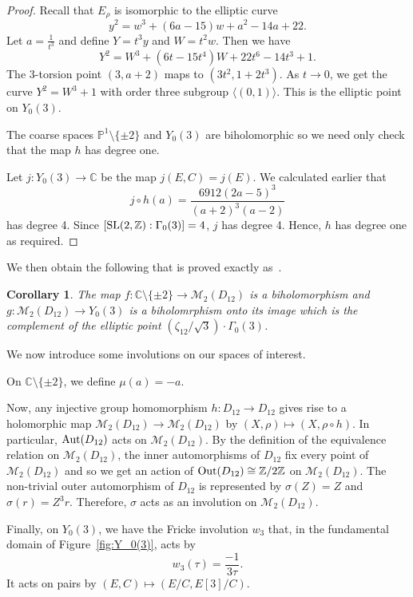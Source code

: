 \documentclass[a4paper,11pt]{amsart}
\numberwithin{equation}{section}
\numberwithin{figure}{section}
\numberwithin{table}{section}
\newtheorem{corollary}[theorem]{Corollary}
\newcommand{\C}{\mathbb{C}}
\newcommand{\Z}{\mathbb{Z}}
\DeclareMathOperator{\SL}{{\rm{SL}}}
\DeclareMathOperator{\Aut}{{\rm{Aut}}}
\DeclareMathOperator{\Out}{{\rm{Out}}}
\begin{document}
\begin{proof}
    Recall that $E_{\rho}$ is isomorphic to the elliptic curve
    \[y^2 = w^3 + (6a-15)w + a^2-14a+22.\]
    Let $a = \frac{1}{t^3}$ and define $Y = t^3y$ and $W = t^2w$. Then we have
    \[Y^2 = W^3 + (6t-15t^4)W + 22t^6-14t^3+1.\]
    The 3-torsion point $(3,a+2)$ maps to $(3t^2,1+2t^3)$. As $t\to0$, we get the curve $Y^2 = W^3+1$ with order three subgroup $\langle(0,1)\rangle$. This is the elliptic point on $Y_{0}(3)$.

    The coarse spaces $\mathbb{P}^{1}\setminus\{\pm 2\}$ and $Y_{0}(3)$ are biholomorphic so we need only check that the map $h$ has degree one.

    Let $j:Y_{0}(3)\to\C$ be the map $j(E,C) = j(E)$. We calculated earlier that
    \[j\circ h(a) = \frac{6912(2a-5)^3}{(a+2)^3(a-2)}\]
    has degree 4. Since $[\SL(2,\Z):\Gamma_{0}(3)] = 4$, $j$ has degree 4. Hence, $h$ has degree one as required.
\end{proof}

We then obtain the following that is proved exactly as~\cite[Corollary 2.7]{Muk}.

\begin{corollary}
    The map $f:\C\setminus\{\pm 2\}\to\mathcal{M}_{2}(D_{12})$ is a biholomorphism and $g:\mathcal{M}_{2}(D_{12})\to Y_{0}(3)$ is a biholomrphism onto its image which is the complement of the elliptic point $(\zeta_{12}/\sqrt{3})\cdot\Gamma_{0}(3)$.
\end{corollary}

We now introduce some involutions on our spaces of interest.

On $\C\setminus\{\pm 2\}$, we define $\mu(a) = -a$.

Now, any injective group homomorphism $h: D_{12} \to D_{12}$ gives rise to a holomorphic map $\mathcal{M}_{2}(D_{12})\to\mathcal{M}_{2}(D_{12})$ by $(X,\rho)\mapsto(X,\rho\circ h)$. In particular, $\Aut(D_{12})$ acts on $\mathcal{M}_{2}(D_{12})$. By the definition of the equivalence relation on $\mathcal{M}_{2}(D_{12})$, the inner automorphisms of $D_{12}$ fix every point of $\mathcal{M}_{2}(D_{12})$ and so we get an action of $\Out(D_{12})\cong \Z/2\Z$ on $\mathcal{M}_{2}(D_{12})$. The non-trivial outer automorphism of $D_{12}$ is represented by $\sigma(Z) = Z$ and $\sigma(r) = Z^3 r$. Therefore, $\sigma$ acts as an involution on $\mathcal{M}_{2}(D_{12})$.

Finally, on $Y_{0}(3)$, we have the Fricke involution $w_{3}$ that, in the fundamental domain of Figure~\ref{fig:Y_0(3)}, acts by
\[w_{3}(\tau) = \frac{-1}{3\tau}.\]
It acts on pairs by $(E,C)\mapsto (E/C,E[3]/C)$.
\end{document}
